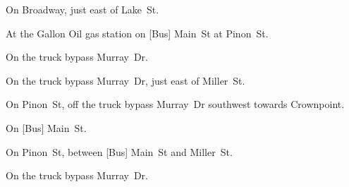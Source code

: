 
\begin{LocationList}

On Broadway, just east of Lake~St.

At the Gallon Oil gas station on [Bus] Main~St at Pinon~St.

\Location{\GarageHQ \Garage}
On the truck bypass  Murray~Dr.

On the truck bypass  Murray~Dr, just east of Miller~St.

On Pinon~St, off the truck bypass  Murray~Dr southwest towards Crownpoint.

\Location{\RecruitmentAgency \Recruitment}
On [Bus] Main~St.

On Pinon~St, between [Bus] Main~St and Miller~St.

On the truck bypass  Murray~Dr.

\end{LocationList}
